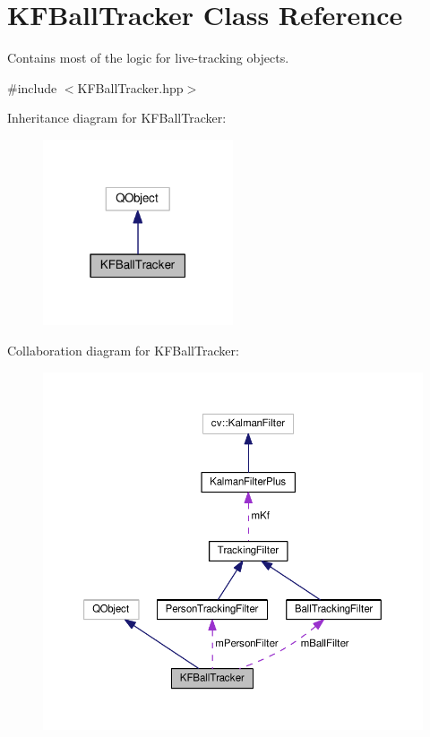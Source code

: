 \hypertarget{classKFBallTracker}{}\section{K\+F\+Ball\+Tracker Class Reference}
\label{classKFBallTracker}


Contains most of the logic for live-\/tracking objects.  




{\ttfamily \#include $<$K\+F\+Ball\+Tracker.\+hpp$>$}



Inheritance diagram for K\+F\+Ball\+Tracker\+:\nopagebreak
\begin{figure}[H]
\begin{center}
\leavevmode
\includegraphics[width=159pt]{classKFBallTracker__inherit__graph}
\end{center}
\end{figure}


Collaboration diagram for K\+F\+Ball\+Tracker\+:\nopagebreak
\begin{figure}[H]
\begin{center}
\leavevmode
\includegraphics[width=350pt]{classKFBallTracker__coll__graph}
\end{center}
\end{figure}
